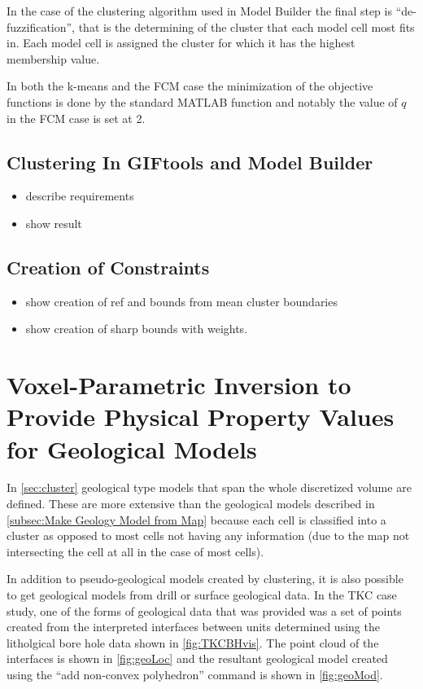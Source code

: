 In the case of the clustering algorithm used in Model Builder the final step is ``de-fuzzification'', that is the determining of the cluster that each model cell most fits in. Each model cell is assigned the cluster for which it has the highest membership value.

In both the k-means and the \ac{FCM} case the minimization of the objective functions is done by the standard MATLAB function and notably the value of $q$ in the \ac{FCM} case is set at 2.

\subsection{Clustering In GIFtools and Model Builder}
\label{subsec:clusterTools}

\begin{itemize}
 \item describe requirements
 \item show result
\end{itemize}

\subsection{Creation of Constraints}
\label{subsec:clusterConstraints}

\begin{itemize}
 \item show creation of ref and bounds from mean cluster boundaries
 \item show creation of sharp bounds with weights.
\end{itemize}

\section{Voxel-Parametric Inversion to Provide Physical Property Values for Geological Models}
\label{sec:voxelParam}

In \autoref{sec:cluster} geological type models that span the whole discretized volume are defined. These are more extensive than the geological models described in \autoref{subsec:Make Geology Model from Map} because each cell is classified into a cluster as opposed to most cells not having any information (due to the map not intersecting the cell at all in the case of most cells).

In addition to pseudo-geological models created by clustering, it is also possible to get geological models from drill or surface geological data. In the TKC case study, one of the forms of geological data that was provided was a set of points created from the interpreted interfaces between units determined using the litholgical bore hole data shown in \autoref{fig:TKCBHvis}. The point cloud of the interfaces is shown in \autoref{fig:geoLoc} and the resultant geological model created using the ``add non-convex polyhedron'' command is shown in \autoref{fig:geoMod}.

